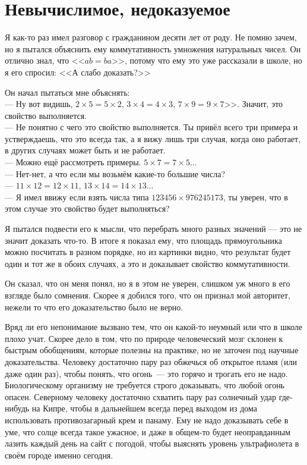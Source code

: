 \section{Невычислимое, недоказуемое}

Я как-то раз имел разговор с гражданином десяти лет от роду. Не помню зачем, но я пытался объяснить ему коммутативность умножения натуральных чисел. Он отлично знал, что <<$ab=ba$>>, потому что ему это уже рассказали в школе, но я его спросил: <<А слабо доказать?>>

Он начал пытаться мне объяснять:\\
--- Ну вот видишь, $2\times 5 = 5\times 2$, $3\times 4 = 4\times 3$, $7\times 9=9\times 7$>>. Значит, это свойство выполняется.\\
--- Не понятно с чего это свойство выполняется. Ты привёл всего три примера и устверждаешь, что это всегда так, а я вижу лишь три случая, когда оно работает, в других случаях может быть и не работает.\\
--- Можно ещё рассмотреть примеры. $5\times 7=7\times 5$...\\
--- Нет-нет, а что если мы возьмём какие-то большие числа?\\
--- $11\times12 = 12\times 11$, $13\times14=14\times 13$...\\
--- Я имел ввижу если взять числа типа $123456\times 976245173$, ты уверен, что в этом случае это свойство будет выполняться?

Я пытался подвести его к мысли, что перебрать много разных значений --- это не значит доказать что-то. В итоге я показал ему, что площадь прямоугольника можно посчитать в разном порядке, но из картинки видно, что результат будет один и тот же в обоих случаях, а это и доказывает свойство коммутативности.

Он сказал, что он меня понял, но я в этом не уверен, слишком уж много в его взгляде было сомнения. Скорее я добился того, что он признал мой авторитет, нежели то что его доказательство было не верно.

Вряд ли его непонимание вызвано тем, что он какой-то неумный или что в школе плохо учат. Скорее дело в том, что по природе человеческий мозг склонен к быстрым обобщениям, которые полезны на практике, но не заточен под научные доказательства. Человеку достаточно пару раз обжечься об открытое пламя (или даже один раз), чтобы понять, что огонь~--- это горячо и трогать его не надо. Биологическому организму не требуется строго доказывать, что любой огонь опасен. Северному человеку достаточно схватить пару раз солнечный удар где-нибудь на Кипре, чтобы в дальнейшем всегда перед выходом из дома использовать противозагарный крем и панаму. Ему не надо доказывать себе в уме, что солце всегда такое ужасное, и даже в общем-то будет неоправданным лазить каждый день на сайт с погодой, чтобы выяснять уровень ультрафиолета в своём городе именно сегодня.

